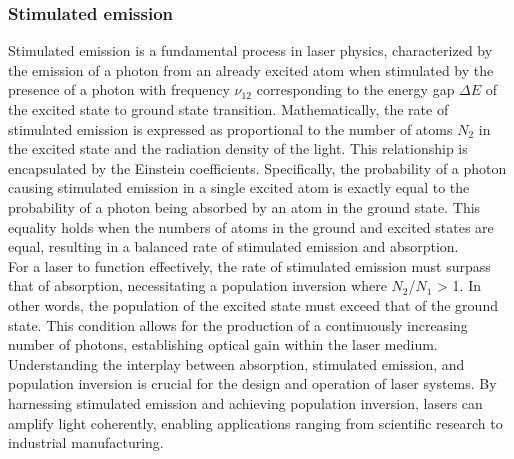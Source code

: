     \subsubsection{Stimulated emission}
    Stimulated emission is a fundamental process in laser physics, characterized by the emission of a photon from an already excited atom when stimulated by the presence of a photon with frequency $\nu_{12}$ corresponding to the energy gap $\Delta E$ of the excited state to ground state transition. 
    Mathematically, the rate of stimulated emission is expressed as proportional to the number of atoms $N_2$ in the excited state and the radiation density of the light. 
    This relationship is encapsulated by the Einstein coefficients. 
    Specifically, the probability of a photon causing stimulated emission in a single excited atom is exactly equal to the probability of a photon being absorbed by an atom in the ground state. 
    This equality holds when the numbers of atoms in the ground and excited states are equal, resulting in a balanced rate of stimulated emission and absorption. \\
    For a laser to function effectively, the rate of stimulated emission must surpass that of absorption, necessitating a population inversion where $N_2$/$N_1$ > 1. 
    In other words, the population of the excited state must exceed that of the ground state. 
    This condition allows for the production of a continuously increasing number of photons, establishing optical gain within the laser medium.
    Understanding the interplay between absorption, stimulated emission, and population inversion is crucial for the design and operation of laser systems. 
    By harnessing stimulated emission and achieving population inversion, lasers can amplify light coherently, enabling applications ranging from scientific research to industrial manufacturing.

